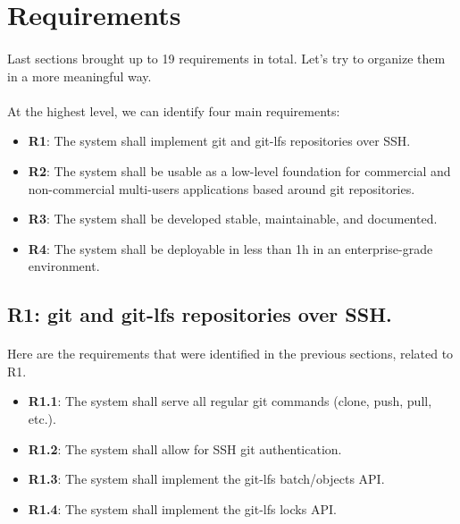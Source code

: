 \newpage
\section{Requirements}

\paragraph{}
Last sections brought up to 19 requirements in total. Let's try to organize them in a more meaningful way.

\paragraph{}
At the highest level, we can identify four main requirements:

\begin{itemize}
    \item \textbf{R1}: The system shall implement git and git-lfs repositories over SSH.
    \item \textbf{R2}: The system shall be usable as a low-level foundation for commercial and non-commercial multi-users applications based around git repositories.
    \item \textbf{R3}: The system shall be developed stable, maintainable, and documented.
    \item \textbf{R4}: The system shall be deployable in less than 1h in an enterprise-grade environment.
\end{itemize}

\subsection{R1: git and git-lfs repositories over SSH.}

\paragraph{}
Here are the requirements that were identified in the previous sections, related to R1.

\begin{itemize}
    \item \textbf{R1.1}: The system shall serve all regular git commands (clone, push, pull, etc.).
    \item \textbf{R1.2}: The system shall allow for SSH git authentication.
    \item \textbf{R1.3}: The system shall implement the git-lfs batch/objects API.
    \item \textbf{R1.4}: The system shall implement the git-lfs locks API.
\end{itemize}

